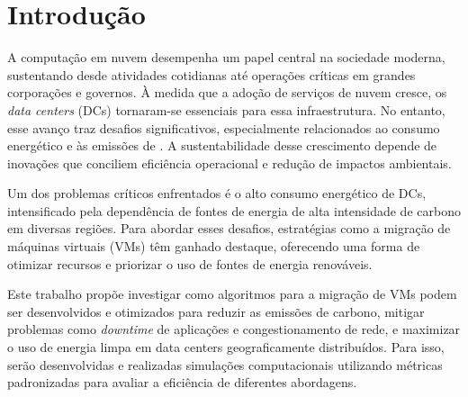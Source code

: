 \documentclass[
	12pt,				%
	oneside,			%
	a4paper,			%
	english,			%
	brazil				%
	]{abntex2ppgsi}
\begin{document}
\tableofcontents*
\cleardoublepage



\textual



% 
%
%
\chapter{Introdução}
A computação em nuvem desempenha um papel central na sociedade moderna, sustentando desde atividades cotidianas até operações críticas em grandes corporações e governos. À medida que a adoção de serviços de nuvem cresce, os \textit{data centers} (DCs) tornaram-se essenciais para essa infraestrutura. No entanto, esse avanço traz desafios significativos, especialmente relacionados ao consumo energético e às emissões de . A sustentabilidade desse crescimento depende de inovações que conciliem eficiência operacional e redução de impactos ambientais.

Um dos problemas críticos enfrentados é o alto consumo energético de DCs, intensificado pela dependência de fontes de energia de alta intensidade de carbono em diversas regiões. Para abordar esses desafios, estratégias como a migração de máquinas virtuais (VMs) têm ganhado destaque, oferecendo uma forma de otimizar recursos e priorizar o uso de fontes de energia renováveis.

Este trabalho propõe investigar como algoritmos para a migração de VMs podem ser desenvolvidos e otimizados para reduzir as emissões de carbono, mitigar problemas como \textit{downtime} de aplicações e congestionamento de rede, e maximizar o uso de energia limpa em data centers geograficamente distribuídos. Para isso, serão desenvolvidas e realizadas simulações computacionais utilizando métricas padronizadas para avaliar a eficiência de diferentes abordagens.
\end{document}
